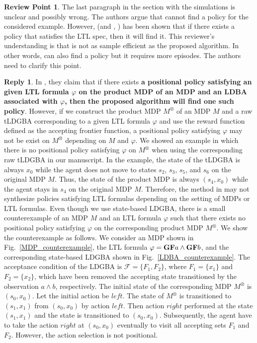 \documentclass[10 pt, dvipdfmx]{article}
\theoremstyle{definition}
\newtheorem{review point}{Review Point}[section]
\newtheorem*{reply}{Reply}
\begin{document}
\begin{review point}
  The last paragraph in the section with the simulations is unclear
and possibly wrong. The authors argue that \cite{HAK2019} cannot find a policy
for the considered example. However, \cite{HAK2019} (and \cite{HKAKPL2019}, \cite{BWZP2019}) has been
shown that if there exists a policy that satisfies the LTL spec, then
it will find it. This reviewer's understanding is that \cite{HAK2019} is not as
sample efficient as the proposed algorithm. In other words, \cite{HAK2019} can
also find a policy but it requires more episodes. The authors need to
clarify this point.
\end{review point}

\begin{reply}
  In \cite{HAK2019}, they claim that if there exists {\bf a positional policy satisfying an given LTL formula $\varphi$ on the product MDP of an MDP and an LDBA associated with $\varphi$, then the proposed algorithm will find one such policy}. However, if we construct the product MDP $M^{\otimes}$ of an MDP $M$ and a raw tLDGBA corresponding to a given LTL formula $\varphi$ and use the reward function defined as the accepting frontier function, a positional policy satisfying $\varphi$ may not be exist on $M^{\otimes}$ depending on $M$ and $\varphi$. We showed an example in which there is no positional policy satisfying $\varphi$ on $M^{\otimes}$ when using the corresponding raw tLDGBA in our manuscript. In the example, the state of the tLDGBA is always $x_0$ while the agent does not move to states $s_2$, $s_3$, $s_5$, and $s_6$ on the original MDP $M$. Thus, the state of the product MDP is always $(s_4, x_0)$ while the agent stays in $s_4$ on the original MDP $M$. Therefore, the method in \cite{HAK2019} may not synthesize policies satisfying LTL formulas depending on the setting of MDPs or LTL formulas.
  Even though we use state-based LDGBA, there is a small counterexample of an MDP $M$ and an LTL formula $\varphi$ such that there exists no positional policy satisfying $\varphi$ on the corresponding product MDP $M^{\otimes}$. We show the counterexample as follows. We consider an MDP shown in Fig.\ \ref{MDP_counterexample}, the LTL formula
  $\varphi = \text{{\bf GF}}a \land \text{{\bf GF}}b$, and the corresponding state-based LDGBA shown in Fig.\ \ref{LDBA_counterexample}. The acceptance condition of the LDGBA is $\mathcal{F} = \{ F_1, F_2 \}$, where $F_1 = \{ x_1 \}$ and $F_2 = \{ x_2 \}$, which have been removed the accepting state transitioned by the observation $a\land b$, respectively. The initial state of the corresponding MDP $M^{\otimes}$ is $(s_0,x_0)$. Let the initial action be $left$. The state of $M^{\otimes}$ is transitioned to $(s_1,x_1)$ from $(s_0,x_0)$ by action $left$. Then action $right$ performed at the state $(s_1,x_1)$ and the state is transitioned to $(s_0,x_0)$. Subsequently, the agent have to take the action $right$ at $(s_0,x_0)$ eventually to visit all accepting sets $F_1$ and $F_2$. However, the action selection is not positional.


\end{reply}
\end{document}
